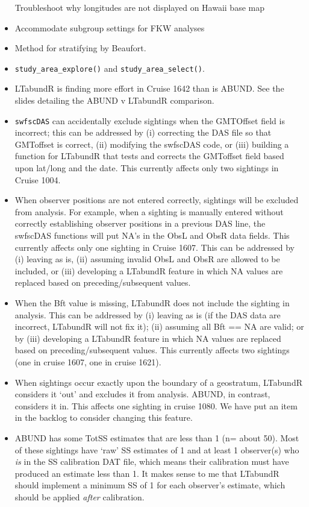 \documentclass[
]{book}
\begin{document}
\begin{itemize}
  Troubleshoot why longitudes are not displayed on Hawaii base map
\item
  Accommodate subgroup settings for FKW analyses
\item
  Method for stratifying by Beaufort.
\item
  \texttt{study\_area\_explore()} and \texttt{study\_area\_select()}.
\item
  LTabundR is finding more effort in Cruise 1642 than is ABUND. See the slides detailing the ABUND v LTabundR comparison.
\item
  \texttt{swfscDAS} can accidentally exclude sightings when the GMTOffset field is incorrect; this can be addressed by (i) correcting the DAS file so that GMToffset is correct, (ii) modifying the swfscDAS code, or (iii) building a function for LTabundR that tests and corrects the GMToffset field based upon lat/long and the date. This currently affects only two sightings in Cruise 1004.
\item
  When observer positions are not entered correctly, sightings will be excluded from analysis. For example, when a sighting is manually entered without correctly establishing observer positions in a previous DAS line, the swfscDAS functions will put NA's in the ObsL and ObsR data fields. This currently affects only one sighting in Cruise 1607. This can be addressed by (i) leaving as is, (ii) assuming invalid ObsL and ObsR are allowed to be included, or (iii) developing a LTabundR feature in which NA values are replaced based on preceding/subsequent values.
\item
  When the Bft value is missing, LTabundR does not include the sighting in analysis. This can be addressed by (i) leaving as is (if the DAS data are incorrect, LTabundR will not fix it); (ii) assuming all Bft == NA are valid; or by (iii) developing a LTabundR feature in which NA values are replaced based on preceding/subsequent values. This currently affects two sightings (one in cruise 1607, one in cruise 1621).
\item
  When sightings occur exactly upon the boundary of a geostratum, LTabundR considers it `out' and excludes it from analysis. ABUND, in contrast, considers it in. This affects one sighting in cruise 1080. We have put an item in the backlog to consider changing this feature.
\item
  ABUND has some TotSS estimates that are less than 1 (n= about 50). Most of these sightings have `raw' SS estimates of 1 and at least 1 observer(s) who \emph{is} in the SS calibration DAT file, which means their calibration must have produced an estimate less than 1. It makes sense to me that LTabundR should implement a minimum SS of 1 for each observer's estimate, which should be applied \emph{after} calibration.

\end{itemize}
\end{document}
